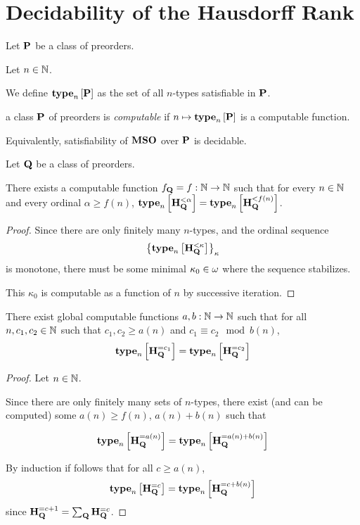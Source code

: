 \section{Decidability of the Hausdorff Rank}

\begin{definition}
    Let $\mathbf{P}$ be a class of preorders.

    Let $n \in \mathbb{N}$.

    We define $\mathbf{type}_{n} \left[ {\mathbf{P}} \right]$ as the set of all
    $n$-types satisfiable in $\mathbf{P}$.
\end{definition}

\begin{definition}
    a class $\mathbf{P}$ of preorders is \emph{computable} if
    $n \mapsto \mathbf{type}_{n} \left[ {\mathbf{P}} \right]$ is a computable function.

    Equivalently, satisfiability of $\mathbf{MSO}$ over $\mathbf{P}$ is decidable.
\end{definition}

\begin{lemma}\label{f-lemma}
    Let $\mathbf{Q}$ be a class of preorders.

    There exists a computable function $f_{\mathbf{Q}} = f: \mathbb{N} \to \mathbb{N}$ such that
    for every $n \in \mathbb{N}$ and every ordinal $\alpha \ge f(n)$,
    $\mathbf{type}_{n} \left[ {\mathbf{H}_{\mathbf{Q}}^{< \alpha}} \right] = \mathbf{type}_{n} \left[ {\mathbf{H}_{\mathbf{Q}}^{< f(n)}} \right]$.
\end{lemma}

\begin{proof}
    Since there are only finitely many $n$-types,
    and the ordinal sequence \[\left\{ {\mathbf{type}_{n} \left[ {\mathbf{H}_{\mathbf{Q}}^{< \kappa}} \right]} \right\}_{\kappa}\]
    is monotone,
    there must be some minimal $\kappa_0 \in \omega$ where the sequence stabilizes.

    This $\kappa_0$ is computable as a function of $n$ by successive iteration.
\end{proof}

\begin{lemma}\label{ab-lemma}
    There exist global computable functions $a, b : \mathbb{N} \to \mathbb{N}$ such that
    for all $n, c_1, c_2 \in \mathbb{N}$ such that $c_1, c_2 \ge a(n)$ and $c_1 \equiv c_2 \mod b(n)$,
    \[\mathbf{type}_{n} \left[ {\mathbf{H}_{\mathbf{Q}}^{= c_1}} \right] = \mathbf{type}_{n} \left[ {\mathbf{H}_{\mathbf{Q}}^{= c_2}} \right]\]
\end{lemma}

\begin{proof}
    Let $n \in \mathbb{N}$.

    Since there are only finitely many sets of $n$-types,
    there exist (and can be computed)
    some $a(n) \ge f(n)$, $a(n) + b(n)$ such that

    \[
        \mathbf{type}_{n} \left[ {\mathbf{H}_{\mathbf{Q}}^{= a(n)}} \right] = \mathbf{type}_{n} \left[ {\mathbf{H}_{\mathbf{Q}}^{= a(n) + b(n)}} \right]
    \]

    By induction if follows that for all $c \ge a(n)$,
    \[
        \mathbf{type}_{n} \left[ {\mathbf{H}_{\mathbf{Q}}^{= c}} \right] = \mathbf{type}_{n} \left[ {\mathbf{H}_{\mathbf{Q}}^{= c + b(n)}} \right]
    \]
    since $\mathbf{H}_{\mathbf{Q}}^{= c + 1} = \sum_{\mathbf{Q}} \mathbf{H}_{\mathbf{Q}}^{= c}$.
\end{proof}

